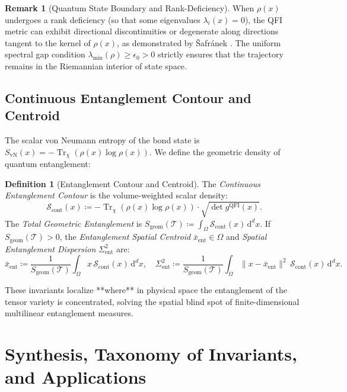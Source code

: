 \documentclass[11pt,a4paper,reqno]{amsart}
\theoremstyle{definition}
\newtheorem{definition}[theorem]{Definition}
\newtheorem{remark}[theorem]{Remark}
\numberwithin{equation}{section}
\newcommand{\Tr}{\operatorname{Tr}}
\newcommand{\dif}{\,\mathrm{d}}
\begin{document}
\begin{remark}[Quantum State Boundary and Rank-Deficiency]
When $\rho(x)$ undergoes a rank deficiency (so that some eigenvalues $\lambda_i(x) = 0$), the QFI metric can exhibit directional discontinuities or degenerate along directions tangent to the kernel of $\rho(x)$, as demonstrated by {\v{S}}afr{\'a}nek \cite{safranek2017discontinuities}. The uniform spectral gap condition $\lambda_{\min}(\rho) \ge \epsilon_0 > 0$ strictly ensures that the trajectory remains in the Riemannian interior of state space.
\end{remark}

\subsection{Continuous Entanglement Contour and Centroid}
The scalar von Neumann entropy of the bond state is $S_{\mathrm{vN}}(x) = -\Tr_\chi(\rho(x) \log \rho(x))$. We define the geometric density of quantum entanglement:

\begin{definition}[Entanglement Contour and Centroid]
The \emph{Continuous Entanglement Contour} is the volume-weighted scalar density:
\begin{equation}
    \mathcal{S}_{\mathrm{cont}}(x) \coloneqq -\Tr_\chi(\rho(x) \log \rho(x)) \cdot \sqrt{\det g^{\mathrm{QFI}}(x)}.
\end{equation}
The \emph{Total Geometric Entanglement} is $S_{\mathrm{geom}}(\mathcal{T}) \coloneqq \int_\Omega \mathcal{S}_{\mathrm{cont}}(x) \dif^d x$.
If $S_{\mathrm{geom}}(\mathcal{T}) > 0$, the \emph{Entanglement Spatial Centroid} $\bar{x}_{\mathrm{ent}} \in \Omega$ and \emph{Spatial Entanglement Dispersion} $\Sigma_{\mathrm{ent}}^2$ are:
\begin{equation}
    \bar{x}_{\mathrm{ent}} \coloneqq \frac{1}{S_{\mathrm{geom}}(\mathcal{T})} \int_\Omega x \, \mathcal{S}_{\mathrm{cont}}(x) \dif^d x, \quad \Sigma_{\mathrm{ent}}^2 \coloneqq \frac{1}{S_{\mathrm{geom}}(\mathcal{T})} \int_\Omega \|x - \bar{x}_{\mathrm{ent}}\|^2 \, \mathcal{S}_{\mathrm{cont}}(x) \dif^d x.
\end{equation}
\end{definition}
These invariants localize **where** in physical space the entanglement of the tensor variety is concentrated, solving the spatial blind spot of finite-dimensional multilinear entanglement measures.

\section{Synthesis, Taxonomy of Invariants, and Applications}
\label{sec:synthesis}
\end{document}
